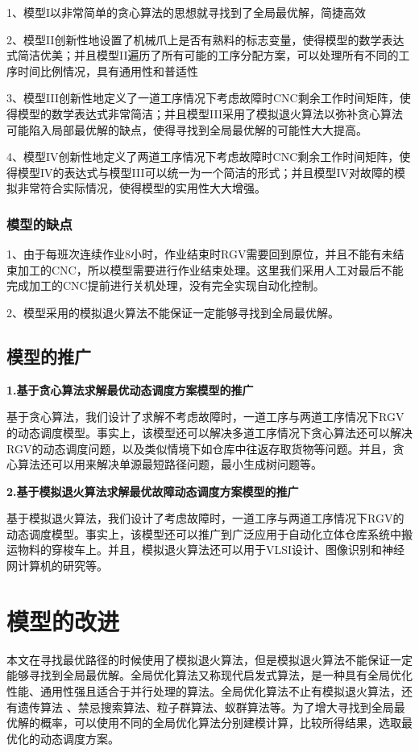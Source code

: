 \documentclass[no-math,withoutpreface,bwprint]{cumcmthesis} %
\numberwithin{equation}{section}
\numberwithin{figure}{section}
\numberwithin{table}{section}
\begin{document}
1、模型I以非常简单的贪心算法的思想就寻找到了全局最优解，简捷高效

2、模型II创新性地设置了机械爪上是否有熟料的标志变量，使得模型的数学表达式简洁优美；并且模型II遍历了所有可能的工序分配方案，可以处理所有不同的工序时间比例情况，具有通用性和普适性

3、模型III创新性地定义了一道工序情况下考虑故障时CNC剩余工作时间矩阵，使得模型的数学表达式非常简洁；并且模型III采用了模拟退火算法以弥补贪心算法可能陷入局部最优解的缺点，使得寻找到全局最优解的可能性大大提高。

4、模型IV创新性地定义了两道工序情况下考虑故障时CNC剩余工作时间矩阵，使得模型IV的表达式与模型III可以统一为一个简洁的形式；并且模型IV对故障的模拟非常符合实际情况，使得模型的实用性大大增强。

\subsubsection{模型的缺点}

1、由于每班次连续作业8小时，作业结束时RGV需要回到原位，并且不能有未结束加工的CNC，所以模型需要进行作业结束处理。这里我们采用人工对最后不能完成加工的CNC提前进行关机处理，没有完全实现自动化控制。

2、模型采用的模拟退火算法不能保证一定能够寻找到全局最优解。

\subsection{模型的推广}

{\bfseries\song1.基于贪心算法求解最优动态调度方案模型的推广}

基于贪心算法，我们设计了求解不考虑故障时，一道工序与两道工序情况下RGV的动态调度模型。事实上，该模型还可以解决多道工序情况下贪心算法还可以解决RGV的动态调度问题，以及类似情境下如仓库中往返存取货物等问题。并且，贪心算法还可以用来解决单源最短路径问题，最小生成树问题等。

{\bfseries\song2.基于模拟退火算法求解最优故障动态调度方案模型的推广}

基于模拟退火算法，我们设计了考虑故障时，一道工序与两道工序情况下RGV的动态调度模型。事实上，该模型还可以推广到广泛应用于自动化立体仓库系统中搬运物料的穿梭车上。并且，模拟退火算法还可以用于VLSI设计、图像识别和神经网计算机的研究等。

\section{模型的改进}
本文在寻找最优路径的时候使用了模拟退火算法，但是模拟退火算法不能保证一定能够寻找到全局最优解。全局优化算法又称现代启发式算法，是一种具有全局优化性能、通用性强且适合于并行处理的算法。全局优化算法不止有模拟退火算法，还有遗传算法 、禁忌搜索算法、粒子群算法、蚁群算法等。为了增大寻找到全局最优解的概率，可以使用不同的全局优化算法分别建模计算，比较所得结果，选取最优化的动态调度方案。
\end{document}
